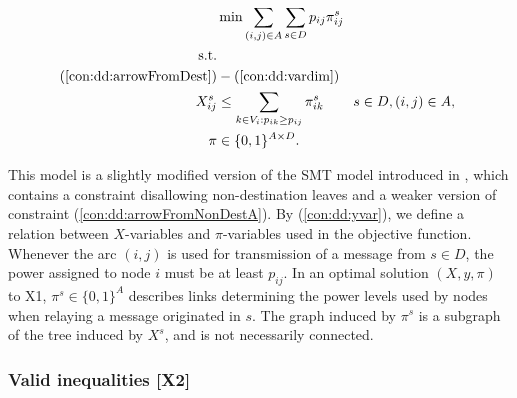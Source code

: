 \begin{subequations}[resume]\label{eq:smt-x2}
\begin{align}
\label{objective:mf} \makebox[0pt][l]{$\displaystyle{} \min \sum\limits_{(i,j) \in A} \sum\limits_{s \in D} p_{ij} \pi^s_{ij} $}\\
\notag\text{s.t.}\\
\notag(\ref{con:dd:arrowFromDest}) &- (\ref{con:dd:vardim})\\
\label{con:dd:yvar} X^s_{ij} & \leq \sum\limits_{k\in V_i:p_{ik}\geq p_{ij}}\pi^s_{ik} & s\in D, (i,j)\in A,\\
\label{con:dd:vardimy} \pi & \in \{0,1\}^{A\times D}.
\end{align}~
\end{subequations}

This model is a slightly modified version of the SMT model introduced in \cite{ivanova16isco}, which contains a constraint disallowing non-destination leaves and a weaker version of constraint (\ref{con:dd:arrowFromNonDestA}).
By (\ref{con:dd:yvar}), we define a relation between $X$-variables and $\pi$-variables used in the objective function.
Whenever the arc $(i,j)$ is used for transmission of a message from $s\in D$, the power assigned to node $i$ must be at least $p_{ij}$.
In an optimal solution $(X,y,\pi)$ to X1, $\pi^s\in \{0,1\}^{A}$ describes links determining the power levels used by nodes when relaying a message originated in $s$.
The graph induced by $\pi^s$ is  a subgraph of the tree induced by $X^s$, and is not necessarily connected.

\subsubsection{Valid inequalities [X2]}

